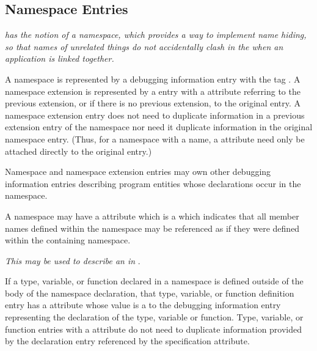 \subsection{Namespace Entries}
\label{chap:namespaceentries}
\textit{ has the notion of a namespace, which provides a way to
implement name hiding, so that names of unrelated things
do not accidentally clash in the
 when an
application is linked together.}

A namespace is represented by a debugging information entry
with the tag \DWTAGnamespaceTARG. A namespace extension
is\hypertarget{chap:DWATextensionpreviousnamespaceextensionororiginalnamespace}{}
represented by a \DWTAGnamespaceNAME{} entry with a
\DWATextensionDEFN{}
attribute referring to the previous extension, or if there
is no previous extension, to the original
\DWTAGnamespaceNAME{}
entry. A namespace extension entry does not need to duplicate
information in a previous extension entry of the namespace
nor need it duplicate information in the original namespace
entry. (Thus, for a namespace with a name,
a \DWATname{} attribute
need only be attached directly to the original
\DWTAGnamespaceNAME{} entry.)

Namespace and namespace extension entries may own
other
debugging information entries describing program entities
whose declarations occur in the namespace.

A namespace may have a
\DWATexportsymbolsDEFN{}
attribute
which is a \CLASSflag{} which
indicates that all member names defined within the
namespace may be referenced as if they were defined within
the containing namespace.

\textit{This may be used to describe an  in }.

If a type, variable, or function declared in a namespace is
defined outside of the body of the namespace declaration,
that type, variable, or function definition entry has a
\DWATspecification{} attribute
whose value is a  to the
debugging information entry representing the declaration of
the type, variable or function. Type, variable, or function
entries with a
\DWATspecification{} attribute
do not need
to duplicate information provided by the declaration entry
referenced by the specification attribute.


